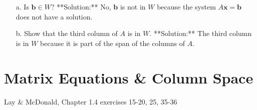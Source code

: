 \documentclass[12pt]{article}
\theoremstyle{definition}
\begin{document}
{\begin{enumerate}
    \begin{itemize}
        \item[a.] Is \( \mathbf{b} \in W \)? 
        **Solution:** No, \( \mathbf{b} \) is not in \( W \) because the system \( A \mathbf{x} = \mathbf{b} \) does not have a solution.
        
        \item[b.] Show that the third column of \( A \) is in \( W \). 
        **Solution:** The third column is in \( W \) because it is part of the span of the columns of \( A \).
    \end{itemize}
\end{enumerate}

}

\newpage
\section{Matrix Equations \& Column Space}

Lay \& McDonald, Chapter 1.4 exercises 15-20, 25, 35-36
\end{document}
